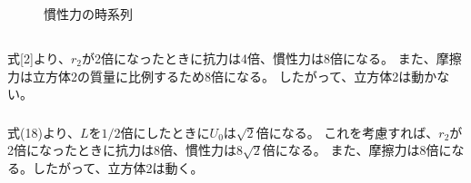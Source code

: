 \documentclass[a4paper]{jsarticle}
\begin{document}
\begin{figure}[htb]
\begin{minipage}{0.3\hsize}
    \caption{慣性力の時系列}
  \end{minipage}
\end{figure}

\subsection{}
\subsubsection{}
式[2]より、$r_2$が2倍になったときに抗力は4倍、慣性力は8倍になる。
また、摩擦力は立方体2の質量に比例するため8倍になる。
したがって、立方体2は動かない。

\subsubsection{}
式(18)より、$L$を$1/2$倍にしたときに$U_0$は$\sqrt{2}$倍になる。
これを考慮すれば、$r_2$が2倍になったときに抗力は8倍、慣性力は$8\sqrt{2}$倍になる。
また、摩擦力は8倍になる。したがって、立方体2は動く。
\end{document}
